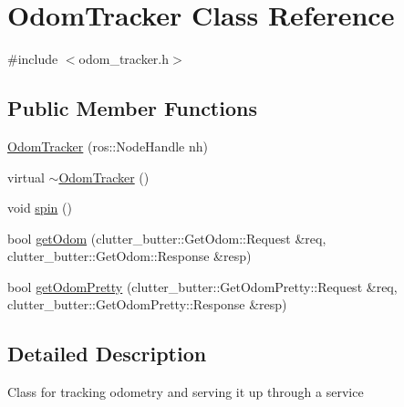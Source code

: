 \hypertarget{classOdomTracker}{\section{Odom\-Tracker Class Reference}
\label{classOdomTracker}
}


{\ttfamily \#include $<$odom\-\_\-tracker.\-h$>$}

\subsection*{Public Member Functions}
\begin{DoxyCompactItemize}
\item 
\hyperlink{classOdomTracker_ad1b275aaf902e8a2463d769a4a6d9705}{Odom\-Tracker} (ros\-::\-Node\-Handle nh)
\item 
virtual \hyperlink{classOdomTracker_abc3bf8996e98c5fd29233954e9ce7ac6}{$\sim$\-Odom\-Tracker} ()
\item 
void \hyperlink{classOdomTracker_adba788d1a5ad15bc5ae3b309bd53e541}{spin} ()
\item 
bool \hyperlink{classOdomTracker_ac803fe8018fecf90c74b039063b6b24d}{get\-Odom} (clutter\-\_\-butter\-::\-Get\-Odom\-::\-Request \&req, clutter\-\_\-butter\-::\-Get\-Odom\-::\-Response \&resp)
\item 
bool \hyperlink{classOdomTracker_a2cbe969abca25bc1eef0ee2deb8953de}{get\-Odom\-Pretty} (clutter\-\_\-butter\-::\-Get\-Odom\-Pretty\-::\-Request \&req, clutter\-\_\-butter\-::\-Get\-Odom\-Pretty\-::\-Response \&resp)
\end{DoxyCompactItemize}


\subsection{Detailed Description}
Class for tracking odometry and serving it up through a service 

